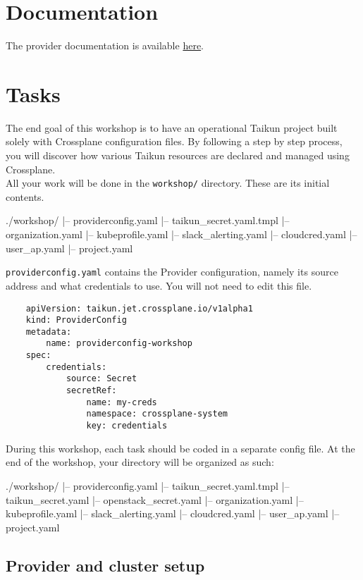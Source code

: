 \section{Documentation}
The provider documentation is available \href{https://doc.crds.dev/github.com/itera-io/provider-jet-taikun}{here}.

\section{Tasks}
The end goal of this workshop is to have an operational Taikun project built solely with Crossplane
configuration files.
By following a step by step process, you will discover how various Taikun
resources are declared and managed using Crossplane.\\

All your work will be done in the \texttt{workshop/} directory. These are its initial contents.
\begin{raw}
./workshop/
|-- providerconfig.yaml
|-- taikun_secret.yaml.tmpl
|-- organization.yaml
|-- kubeprofile.yaml
|-- slack_alerting.yaml
|-- cloudcred.yaml
|-- user_ap.yaml
|-- project.yaml
\end{raw}
\texttt{providerconfig.yaml} contains the Provider configuration,
namely its source address and what credentials to use.
You will not need to edit this file.
\begin{verbatim}
    apiVersion: taikun.jet.crossplane.io/v1alpha1
    kind: ProviderConfig
    metadata:
        name: providerconfig-workshop
    spec:
        credentials:
            source: Secret
            secretRef:
                name: my-creds
                namespace: crossplane-system
                key: credentials
\end{verbatim}

During this workshop, each task should be coded in a separate config file.
At the end of the workshop, your directory will be organized as such:
\begin{raw}
./workshop/
|-- providerconfig.yaml
|-- taikun_secret.yaml.tmpl
|-- taikun_secret.yaml
|-- openstack_secret.yaml
|-- organization.yaml
|-- kubeprofile.yaml
|-- slack_alerting.yaml
|-- cloudcred.yaml
|-- user_ap.yaml
|-- project.yaml
\end{raw}

\subsection{Provider and cluster setup}\label{sec:set}

